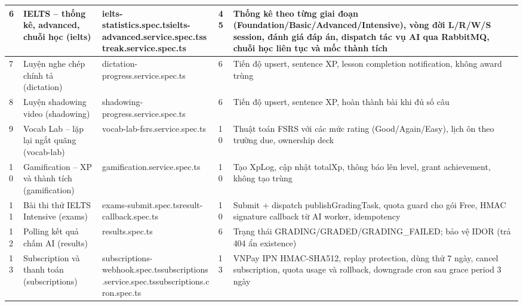 {\begin{longtable}{|p{4\tbu}|p{18\tbu}|p{32\tbu}|p{6\tbu}|p{40\tbu}|}
    6 & IELTS -- thống kê, advanced, chuỗi học (ielts) & ielts-statistics.spec.ts\newline ielts-advanced.service.spec.ts\newline streak.service.spec.ts & 45 & Thống kê theo từng giai đoạn (Foundation\allowbreak{}/Basic\allowbreak{}/Advanced\allowbreak{}/Intensive), vòng đời L/R/W/S session, đánh giá đáp án, dispatch tác vụ AI qua RabbitMQ, chuỗi học liên tục và mốc thành tích \\ \hline

    7 & Luyện nghe chép chính tả (dictation) & dictation-progress.service.spec.ts & 6 & Tiến độ upsert, sentence XP, lesson completion notification, không award trùng \\ \hline

    8 & Luyện shadowing video (shadowing) & shadowing-progress.service.spec.ts & 6 & Tiến độ upsert, sentence XP, hoàn thành bài khi đủ số câu \\ \hline

    9 & Vocab Lab -- lặp lại ngắt quãng (vocab-lab) & vocab-lab-fsrs.service.spec.ts & 10 & Thuật toán FSRS với các mức rating (Good/Again/Easy), lịch ôn theo trường due, ownership deck \\ \hline

    10 & Gamification -- XP và thành tích (gamification) & gamification.service.spec.ts & 10 & Tạo XpLog, cập nhật totalXp, thông báo lên level, grant achievement, không tạo trùng \\ \hline

    11 & Bài thi thử IELTS Intensive (exams) & exams-submit.spec.ts\newline result-callback.spec.ts & 10 & Submit + dispatch publishGradingTask, quota guard cho gói Free, HMAC signature callback từ AI worker, idempotency \\ \hline

    12 & Polling kết quả chấm AI (results) & results.spec.ts & 6 & Trạng thái GRADING/GRADED/GRADING\_\allowbreak{}FAILED; bảo vệ IDOR (trả 404 ẩn existence) \\ \hline

    13 & Subscription và thanh toán (subscriptions) & subscriptions-webhook.spec.ts\newline subscriptions.service.spec.ts\newline subscriptions.cron.spec.ts & 13 & VNPay IPN HMAC-SHA512, replay protection, dùng thử 7 ngày, cancel subscription, quota usage và rollback, downgrade cron sau grace period 3 ngày \\ \hline


\end{longtable}}
